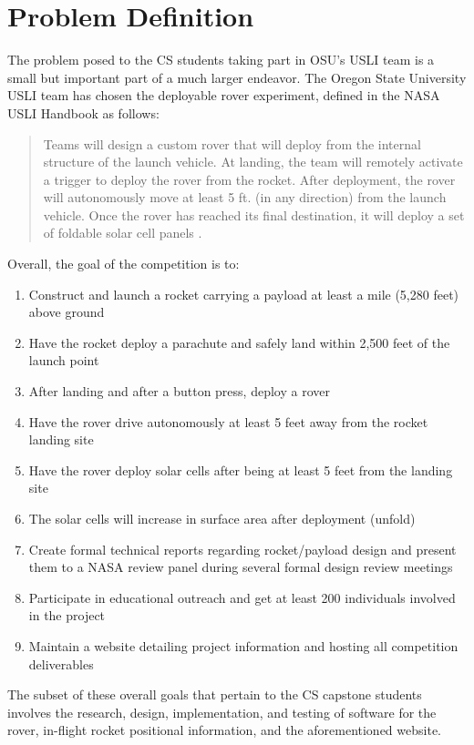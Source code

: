 \documentclass[onecolumn, draftclsnofoot,10pt, compsoc]{IEEEtran}
\begin{document}
\section{Problem Definition}
The problem posed to the CS students taking part in OSU's USLI team is a small but important part of a much larger endeavor. The Oregon State University USLI team has chosen the deployable rover experiment, defined in the NASA USLI Handbook as follows:
\begin{quote}
Teams will design a custom rover that will deploy from the internal structure of the launch
vehicle.
At landing, the team will remotely activate a trigger to deploy the rover from the rocket.
After deployment, the rover will autonomously move at least 5 ft. (in any direction) from the
launch vehicle.
Once the rover has reached its final destination, it will deploy a set of foldable solar cell panels \cite{USLI_handbook}.
\end{quote}
Overall, the goal of the competition is to: 
\begin{enumerate}
\item Construct and launch a rocket carrying a payload at least a mile (5,280 feet) above ground
\item Have the rocket deploy a parachute and safely land within 2,500 feet of the launch point
\item After landing and after a button press, deploy a rover
\item Have the rover drive autonomously at least 5 feet away from the rocket landing site
\item Have the rover deploy solar cells after being at least 5 feet from the landing site
\item The solar cells will increase in surface area after deployment (unfold)
\item Create formal technical reports regarding rocket/payload design and present them to a NASA review panel during several formal design review meetings
\item Participate in educational outreach and get at least 200 individuals involved in the project
\item Maintain a website detailing project information and hosting all competition deliverables
\end{enumerate}
\par The subset of these overall goals that pertain to the CS capstone students involves the research, design, implementation, and testing of software for the rover, in-flight rocket positional information, and the aforementioned website. 
\end{document}
